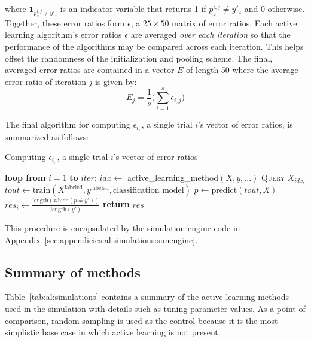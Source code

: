 \noindent where $\textbf{1}_{p^{i,j}_z \neq y'_z}$ is an indicator variable 
that returns 1 if $p^{i,j}_z \neq y'_z$ and 0 otherwise. Together, these error 
ratios 
form $\epsilon$, a $25\times 50$ matrix of error ratios. Each active learning
algorithm's error ratios $\epsilon$ are averaged \textit{over each iteration} 
so that the performance of the algorithms may be compared across each 
iteration. This helps offset the randomness of the initialization and pooling 
scheme. The final, averaged error ratios are contained in a vector 
$E$ of length 50 where the average error ratio of iteration $j$ is given by:
$$E_{j} = \frac{1}{s} \bigg( \sum\limits_{i=1}^{s} \epsilon_{i,j} \bigg)$$

The final algorithm for computing $\epsilon_{i,}$, a single trial $i$'s vector 
of error ratios, is summarized as follows:

\tablespacing
\begin{algorithm}[H]
	\caption{Computing $\epsilon_{i,}$, a single trial $i$'s vector of error 
	ratios}\label{alg:al:simulation:evaluation}
	\begin{algorithmic}[1]
		\State \textbf{loop from} $i=1$ \textbf{to} $iter$:
		\State \indent $idx \gets $ active\_learning\_method$(X,y,...)$
		\State \indent \textsc{Query} $X_{idx,}$
		\State \indent $tout \gets 
		\text{train}(X^{\text{labeled}},y^{\text{labeled}},\text{classification 
		model})$
		\State \indent $p \gets \text{predict}(tout,X)$
		\State \indent $res_i\gets \frac{\text{length}(\text{which}(p \neq y'))}
		{\text{length}(y')}$
		\State \textbf{return} $res$
		\EndProcedure
	\end{algorithmic}
\end{algorithm}
\bodyspacing

\noindent This procedure is encapsulated by 
the simulation engine code in 
Appendix~\ref{sec:appendicies:al:simulations:simengine}.

\subsection{Summary of methods}
\label{sec:al:simulation:methods}

Table~\ref{tab:al:simulations} contains a summary of the active learning 
methods used in the simulation with details such as tuning parameter values. 
As a point of comparison, random sampling is used as the control because it is 
the most simplistic base case in which active learning is not present.

